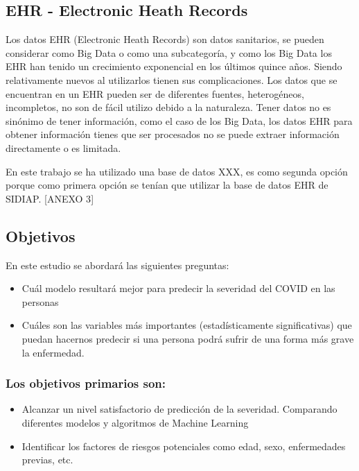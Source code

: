 \documentclass[
]{article}
\begin{document}
\hypertarget{ehr---electronic-heath-records}{%
\subsection{EHR - Electronic Heath
Records}\label{ehr---electronic-heath-records}}

Los datos EHR (Electronic Heath Records) son datos sanitarios, se pueden
considerar como Big Data o como una subcategoría, y como los Big Data
los EHR han tenido un crecimiento exponencial en los últimos quince
años. Siendo relativamente nuevos al utilizarlos tienen sus
complicaciones. Los datos que se encuentran en un EHR pueden ser de
diferentes fuentes, heterogéneos, incompletos, no son de fácil utilizo
debido a la naturaleza. Tener datos no es sinónimo de tener información,
como el caso de los Big Data, los datos EHR para obtener información
tienes que ser procesados no se puede extraer información directamente o
es limitada.

En este trabajo se ha utilizado una base de datos XXX, es como segunda
opción porque como primera opción se tenían que utilizar la base de
datos EHR de SIDIAP. {[}ANEXO 3{]}

\hypertarget{objetivos}{%
\subsection{Objetivos}\label{objetivos}}

En este estudio se abordará las siguientes preguntas:

\begin{itemize}
\item
  Cuál modelo resultará mejor para predecir la severidad del COVID en
  las personas
\item
  Cuáles son las variables más importantes (estadísticamente
  significativas) que puedan hacernos predecir si una persona podrá
  sufrir de una forma más grave la enfermedad.
\end{itemize}

\hypertarget{los-objetivos-primarios-son}{%
\subsubsection{Los objetivos primarios
son:}\label{los-objetivos-primarios-son}}

\begin{itemize}
\item
  Alcanzar un nivel satisfactorio de predicción de la severidad.
  Comparando diferentes modelos y algoritmos de Machine Learning
\item
  Identificar los factores de riesgos potenciales como edad, sexo,
  enfermedades previas, etc.
\end{itemize}
\end{document}
